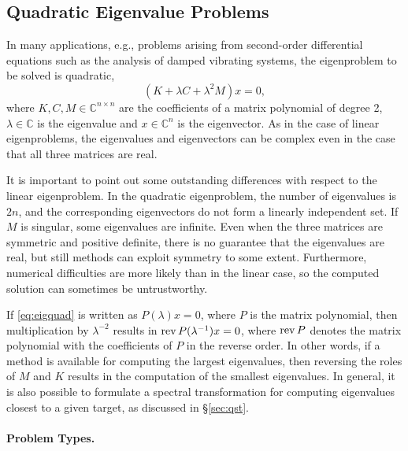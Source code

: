 \subsection{\label{sec:qep}Quadratic Eigenvalue Problems}

In many applications, e.g., problems arising from second-order differential equations such as the analysis of damped vibrating systems, the eigenproblem to be solved is quadratic,
\begin{equation}
(K+\lambda C+\lambda^2M)x=0,\label{eq:eigquad}
\end{equation}
where $K,C,M\in\mathbb{C}^{n\times n}$ are the coefficients of a matrix polynomial of degree 2, $\lambda\in\mathbb{C}$ is the eigenvalue and $x\in\mathbb{C}^n$ is the eigenvector. As in the case of linear eigenproblems, the eigenvalues and eigenvectors can be complex even in the case that all three matrices are real.

It is important to point out some outstanding differences with respect to the linear eigenproblem. In the quadratic eigenproblem, the number of eigenvalues is $2n$, and the corresponding eigenvectors do not form a linearly independent set. If $M$ is singular, some eigenvalues are infinite. Even when the three matrices are symmetric and positive definite, there is no guarantee that the eigenvalues are real, but still methods can exploit symmetry to some extent. Furthermore, numerical difficulties are more likely than in the linear case, so the computed solution can sometimes be untrustworthy.

If \eqref{eq:eigquad} is written as $P(\lambda)x=0$, where $P$ is the matrix polynomial, then multiplication by $\lambda^{-2}$ results in $\operatorname{rev} P(\lambda^{-1})x=0$, where $\operatorname{rev} P$ denotes the matrix polynomial with the coefficients of $P$ in the reverse order. In other words, if a method is available for computing the largest eigenvalues, then reversing the roles of $M$ and $K$ results in the computation of the smallest eigenvalues. In general, it is also possible to formulate a spectral transformation for computing eigenvalues closest to a given target, as discussed in \S\ref{sec:qst}.

\paragraph{Problem Types.}

